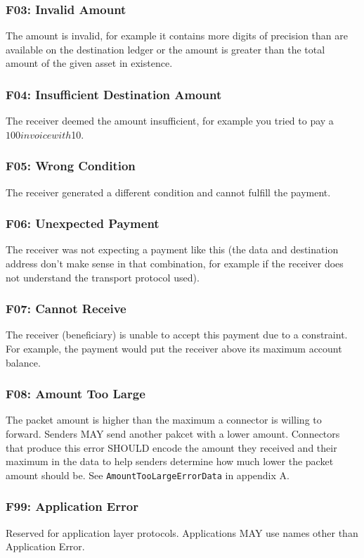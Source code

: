 \documentclass[11pt,twoside,a4paper]{article}
\begin{document}
\subsubsection{F03: Invalid Amount}
The amount is invalid, for example it contains more digits of precision than are available on the destination ledger or the amount is greater than the total amount of the given asset in existence.

\subsubsection{F04: Insufficient Destination Amount}
The receiver deemed the amount insufficient, for example you tried to pay a $100 invoice with $10.

\subsubsection{F05: Wrong Condition}
The receiver generated a different condition and cannot fulfill the payment.

\subsubsection{F06: Unexpected Payment}
The receiver was not expecting a payment like this (the data and destination address don't make sense in that combination, for example if the receiver does not understand the transport protocol used).

\subsubsection{F07: Cannot Receive}
The receiver (beneficiary) is unable to accept this payment due to a constraint. For example, the payment would put the receiver above its maximum account balance.

\subsubsection{F08: Amount Too Large}
The packet amount is higher than the maximum a connector is willing to forward. Senders MAY send another pakcet with a lower amount. Connectors that produce this error SHOULD encode the amount they received and their maximum in the data to help senders determine how much lower the packet amount should be.
See {\tt AmountTooLargeErrorData} in appendix A.

\subsubsection{F99: Application Error}
Reserved for application layer protocols. Applications MAY use names other than Application Error.
\end{document}
